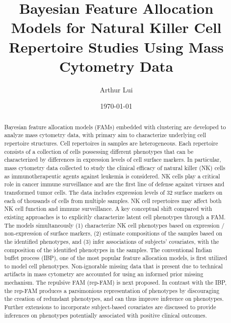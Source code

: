 \documentclass[12pt,]{article}
\title{Bayesian Feature Allocation Models for Natural Killer Cell Repertoire Studies Using Mass Cytometry Data}
\author{Arthur Lui}
\date{\today}
\begin{document}
\maketitle
\onehalfspacing



\begin{abstract}
\noindent
Bayesian feature allocation models (FAMs) embedded with
clustering are developed to analyze mass cytometry data, with primary aim to
characterize underlying cell repertoire structures.   Cell repertoires in
samples are heterogeneous. Each repertoire consists of a collection of cells
possessing different phenotypes that can be characterized by differences in
expression levels of cell surface markers.  In particular, mass cytometry data
collected to study the clinical efficacy of natural killer (NK) cells as
immunotherapeutic agents against leukemia is considered. NK cells play a
critical role in cancer immune surveillance and are the first line of defense
against viruses and transformed tumor cells.  The data includes expression
levels of 32 surface markers on each of thousands of cells from multiple
samples. NK cell repertoires may affect both NK cell function and immune
surveillance.  A key conceptual shift compared with existing approaches is to
explicitly characterize latent cell phenotypes through a FAM.  The models
simultaneously (1) characterize NK cell phenotypes based on expression /
non-expression of surface markers, (2) estimate compositions of the samples
based on the identified phenotypes, and (3) infer associations of subjects'
covariates, with the composition of the identified phenotypes in the samples.
The conventional Indian buffet process (IBP), one of the most popular feature
allocation models, is first utilized to model cell phenotypes. Non-ignorable
missing data that is present due to technical artifacts in mass cytometry are
accounted for using an informed prior missing mechanism. The repulsive FAM
(rep-FAM) is next proposed.  In contrast with the IBP, the rep-FAM produces a
parsimonious representation of phenotypes by discouraging the creation of
redundant phenotypes, and can thus improve inference on phenotypes.  Further
extensions to incorporate subject-based covariates are discussed to provide
inferences on phenotypes potentially associated with positive clinical
outcomes.  

\end{abstract}
\end{document}
